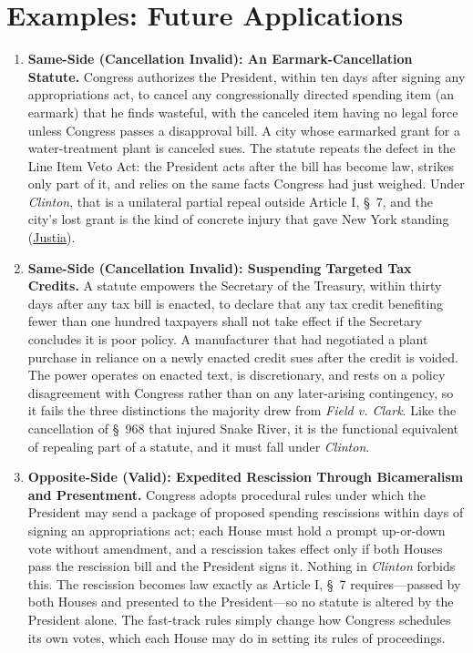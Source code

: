 \documentclass[12pt]{article}
\begin{document}
\section{Examples: Future Applications}
\begin{enumerate}

\item \textbf{Same-Side (Cancellation Invalid): An Earmark-Cancellation Statute.} Congress authorizes the President, within ten days after signing any appropriations act, to cancel any congressionally directed spending item (an earmark) that he finds wasteful, with the canceled item having no legal force unless Congress passes a disapproval bill. A city whose earmarked grant for a water-treatment plant is canceled sues. The statute repeats the defect in the Line Item Veto Act: the President acts after the bill has become law, strikes only part of it, and relies on the same facts Congress had just weighed. Under \textit{Clinton}, that is a unilateral partial repeal outside Article I, \S~7, and the city's lost grant is the kind of concrete injury that gave New York standing (\href{https://supreme.justia.com/cases/federal/us/524/417/}{Justia}).

\item \textbf{Same-Side (Cancellation Invalid): Suspending Targeted Tax Credits.} A statute empowers the Secretary of the Treasury, within thirty days after any tax bill is enacted, to declare that any tax credit benefiting fewer than one hundred taxpayers shall not take effect if the Secretary concludes it is poor policy. A manufacturer that had negotiated a plant purchase in reliance on a newly enacted credit sues after the credit is voided. The power operates on enacted text, is discretionary, and rests on a policy disagreement with Congress rather than on any later-arising contingency, so it fails the three distinctions the majority drew from \textit{Field v. Clark}. Like the cancellation of \S~968 that injured Snake River, it is the functional equivalent of repealing part of a statute, and it must fall under \textit{Clinton}.

\item \textbf{Opposite-Side (Valid): Expedited Rescission Through Bicameralism and Presentment.} Congress adopts procedural rules under which the President may send a package of proposed spending rescissions within days of signing an appropriations act; each House must hold a prompt up-or-down vote without amendment, and a rescission takes effect only if both Houses pass the rescission bill and the President signs it. Nothing in \textit{Clinton} forbids this. The rescission becomes law exactly as Article I, \S~7 requires---passed by both Houses and presented to the President---so no statute is altered by the President alone. The fast-track rules simply change how Congress schedules its own votes, which each House may do in setting its rules of proceedings.


\end{enumerate}
\end{document}

